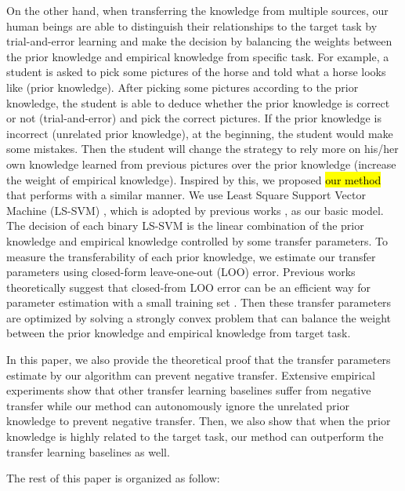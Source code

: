 On the other hand, when transferring the knowledge from multiple sources, our human beings are able to distinguish their relationships to the target task by trial-and-error learning and make the decision by balancing the weights between the prior knowledge and empirical knowledge from specific task. For example, a student is asked to pick some pictures of the horse and told what a horse looks like (prior knowledge). After picking some pictures according to the prior knowledge, the student is able to deduce whether the prior knowledge is correct or not (trial-and-error) and pick the correct pictures. If the prior knowledge is incorrect (unrelated prior knowledge), at the beginning, the student would make some mistakes. Then the student will change the strategy to rely more on his/her own knowledge learned from previous pictures over the prior knowledge (increase the weight of empirical knowledge). 
Inspired by this, we proposed \hl{our method} that performs with a similar manner. 
We use Least Square Support Vector Machine (LS-SVM) \cite{suykens1999least}, which is adopted by previous works \cite{tommasi2014learning} \cite{kuzborskij2013n}, as our basic model. The decision of each binary LS-SVM is the linear combination of the prior knowledge and empirical knowledge controlled by some transfer parameters. To measure the transferability of each prior knowledge, we estimate our transfer parameters using closed-form leave-one-out (LOO) error. Previous works theoretically suggest that closed-from LOO error can be an efficient way for parameter estimation with a small training set \cite{kuzborskij2013stability} \cite{cawley2006leave}. Then these transfer parameters are optimized by solving a strongly convex problem that can balance the weight between the prior knowledge and empirical knowledge from target task. 

In this paper, we also provide the theoretical proof that the transfer parameters estimate by our algorithm can prevent negative transfer. Extensive empirical experiments show that other transfer learning baselines suffer from negative transfer while our method can autonomously ignore the unrelated prior knowledge to prevent negative transfer. Then, we also show that when the prior knowledge is highly related to the target task, our method can outperform the transfer learning baselines as well.

The rest of this paper is organized as follow:
  
